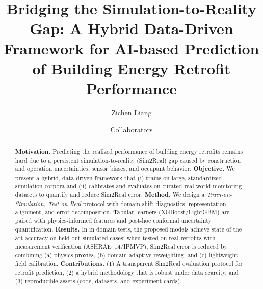 \documentclass{article}
\title{Bridging the Simulation-to-Reality Gap: A Hybrid Data-Driven Framework for AI-based Prediction of Building Energy Retrofit Performance}
\author{Zichen Liang \and Collaborators}
\date{}
\begin{document}
\maketitle
\begin{abstract}
\textbf{Motivation.} Predicting the realized performance of building energy retrofits remains hard due to a persistent simulation-to-reality (Sim2Real) gap caused by construction and operation uncertainties, sensor biases, and occupant behavior.
\textbf{Objective.} We present a hybrid, data-driven framework that (i) trains on large, standardized simulation corpora and (ii) calibrates and evaluates on curated real-world monitoring datasets to quantify and reduce Sim2Real error.
\textbf{Method.} We design a \emph{Train-on-Simulation, Test-on-Real} protocol with domain shift diagnostics, representation alignment, and error decomposition. Tabular learners (XGBoost/LightGBM) are paired with physics-informed features and post-hoc conformal uncertainty quantification. 
\textbf{Results.} In in-domain tests, the proposed models achieve state-of-the-art accuracy on held-out simulated cases; when tested on real retrofits with measurement verification (ASHRAE~14/IPMVP), Sim2Real error is reduced by combining (a) physics proxies, (b) domain-adaptive reweighting, and (c) lightweight field calibration.
\textbf{Contributions.} (1) A transparent Sim2Real evaluation protocol for retrofit prediction, (2) a hybrid methodology that is robust under data scarcity, and (3) reproducible assets (code, datasets, and experiment cards).
\end{abstract}
\end{document}
